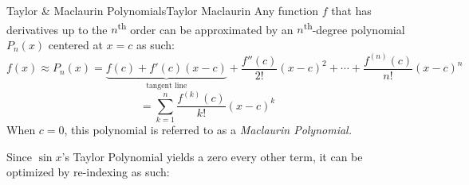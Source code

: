 \documentclass[10pt]{article}
\theoremstyle{definition}
\begin{document}
\begin{theorem}{Taylor \& Maclaurin Polynomials}{Taylor Maclaurin}
    Any function $f$ that has derivatives up to the $n$\textsuperscript{th} order can be approximated by an $n$\textsuperscript{th}-degree polynomial $P_n(x)$ centered at $x=c$ as such:
    \[f(x) \approx P_n(x)= \underbrace{f(c)+f'(c)(x-c)}_{\text{tangent line}}+\frac{f''(c)}{2!}(x-c)^2 + \cdots + \frac{f^{(n)}(c)}{n!}(x-c)^n\]
    \[= \sum_{k=1}^{n} \frac{f^{(k)}(c)}{k!}(x-c)^k\]
    When $c=0$, this polynomial is referred to as a \textit{Maclaurin Polynomial.}
\end{theorem}

Since $\sin x $'s Taylor Polynomial yields a zero every other term, it can be optimized by re-indexing as such:

\vspace{1cm}

\begin{center}
\end{center}
\end{document}
